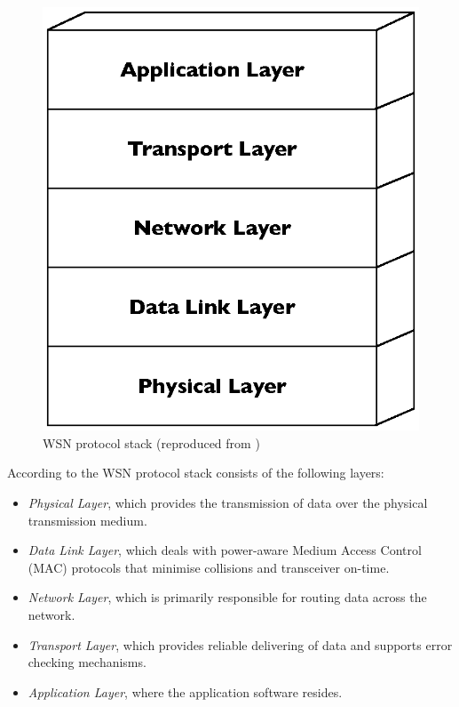\begin{figure}[h]
\centering
\includegraphics[scale=0.65]{img/ProtStack.eps}
\caption[WSN protocol stack]{WSN protocol stack (reproduced from \cite{SensorSurveyAkyildiz:2002})}
\label{Fig:ProtStack}
\end{figure}

According to \cite{SensorSurveyAkyildiz:2002} the WSN protocol stack consists
of the following layers:

\begin{itemize}
\item \emph{Physical Layer}, which provides the transmission of data over the physical transmission medium.
\item \emph{Data Link Layer}, which deals with power-aware Medium Access Control (MAC) protocols that minimise collisions and transceiver on-time.
\item \emph{Network Layer}, which is primarily responsible for
routing data across the network.
\item \emph{Transport Layer}, which provides reliable delivering of data and
supports error checking mechanisms.
\item \emph{Application Layer}, where the application software resides.
\end{itemize}

